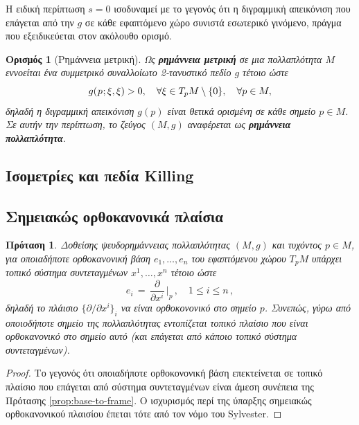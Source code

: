 \documentclass[11pt,a4paper,twoside,openright]{book}
\newtheorem{proposition}[lemma]{Πρόταση}
\newtheorem{definition}[lemma]{Ορισμός}
\begin{document}
\noindent
Η ειδική περίπτωση $s=0$ ισοδυναμεί με το γεγονός ότι η διγραμμική απεικόνιση που επάγεται από την $g$ σε κάθε εφαπτόμενο χώρο
συνιστά εσωτερικό γινόμενο, πράγμα που εξειδικεύεται στον ακόλουθο ορισμό.

\begin{definition}[Ρημάννεια μετρική]\label{def:riemannian-metrics}
Ως \textbf{ρημάννεια μετρική} σε μια πολλαπλότητα $Μ$ εννοείται
ένα συμμετρικό συναλλοίωτο 2-τανυστικό πεδίο $g$ τέτοιο ώστε
\begin{equation}\label{eq:definition-riemannian-metric}
g(\hspace{.5pt}p\hspace{.5pt}; \xi, \xi) > 0,
\quad
\forall \xi \in T_pM \setminus \{0\},
\quad
\forall p \in M,
\end{equation}
δηλαδή η διγραμμική απεικόνιση
$g(p)$ είναι θετικά ορισμένη
σε κάθε σημείο $p \in M$.
Σε αυτήν την περίπτωση, το ζεύγος $(Μ, g)$ αναφέρεται ως \textbf{ρημάννεια πολλαπλότητα}.
\end{definition}

\subsection{Ισομετρίες και πεδία Killing}
	\label{sec:isometries-and-killing-fields}

\subsection{Σημειακώς ορθοκανονικά πλαίσια}
	\label{sec:orthonormal-frames}

\begin{proposition}
\label{prop:orthonormal-base-to-frame}
Δοθείσης ψευδορημάννειας πολλαπλότητας $(M, g)$ και τυχόντος $p \in M$,
για οποιαδήποτε ορθοκανονική βάση $e_1, \dots, e_n$ του εφαπτόμενου χώρου $Τ_pM$
υπάρχει τοπικό σύστημα συντεταγμένων $x^1, \dots, x^n$ τέτοιο ώστε
\begin{equation}
e_i
\,
=
\,
\frac{\partial}{\partial x^i}\,\Big|_p\,,
\quad
1 \le i \le n\,,
\end{equation}
δηλαδή το πλάισιο $\{\partial/\partial x^i\}_i$ να είναι ορθοκονονικό στο σημείο $p$. Συνεπώς, γύρω από οποιοδήποτε σημείο της πολλαπλότητας εντοπίζεται τοπικό πλαίσιο που είναι ορθοκανονικό στο σημείο αυτό
(και επάγεται από κάποιο τοπικό σύστημα συντεταγμένων).
\end{proposition}
\begin{proof}
Το γεγονός ότι οποιαδήποτε ορθοκονονική βάση επεκτείνεται σε τοπικό πλαίσιο που επάγεται από σύστημα συντεταγμένων είναι άμεση συνέπεια της Πρότασης \eqref{prop:base-to-frame}. Ο ισχυρισμός περί της ύπαρξης σημειακώς ορθοκανονικού
πλαισίου έπεται τότε από τον νόμο του Sylvester.
\end{proof}
	
\end{document}
